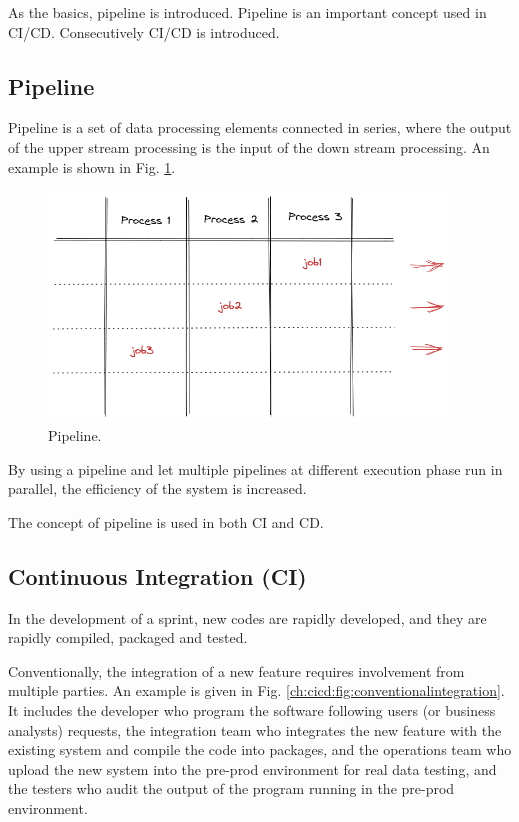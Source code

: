 As the basics, pipeline is introduced. Pipeline is an important concept used in CI/CD. Consecutively CI/CD is introduced. 

\subsection{Pipeline}

Pipeline is a set of data processing elements connected in series, where the output of the upper stream processing is the input of the down stream processing. An example is shown in Fig. \ref{ch:cicd:fig:pipeline}.

\begin{figure}
	\centering
	\includegraphics[width=300pt]{chapters/ap/figures/pipeline.png}
	\caption{Pipeline.} \label{ch:cicd:fig:pipeline}
\end{figure}

By using a pipeline and let multiple pipelines at different execution phase run in parallel, the efficiency of the system is increased.

The concept of pipeline is used in both CI and CD.

\subsection{Continuous Integration (CI)}

In the development of a sprint, new codes are rapidly developed, and they are rapidly compiled, packaged and tested. 

Conventionally, the integration of a new feature requires involvement from multiple parties. An example is given in Fig. \ref{ch:cicd:fig:conventionalintegration}. It includes the developer who program the software following users (or business analysts) requests, the integration team who integrates the new feature with the existing system and compile the code into packages, and the operations team who upload the new system into the pre-prod environment for real data testing, and the testers who audit the output of the program running in the pre-prod environment. 

